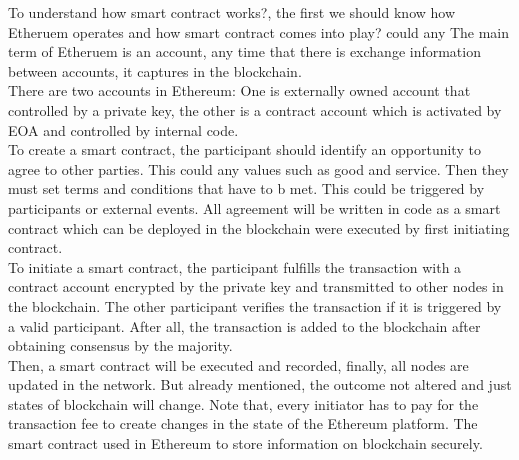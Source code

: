 To understand how smart contract works?, the first we should know how Etheruem operates and how smart contract comes into play?
could any The main term of Etheruem is an account, any time that there is exchange information between accounts, it captures in the blockchain.\\
There are two accounts in Ethereum: One is externally owned account that controlled by a private key, the other is a contract account which is activated by EOA and controlled by internal code.\\
To create a smart contract, the participant should identify an opportunity to agree to other parties. This could any values such as good and service. Then they must set terms and conditions that have to b met. This could be triggered by participants or external events. All agreement will be written in code as a smart contract which can be deployed in the blockchain were executed by first initiating contract.\\
To initiate a smart contract, the participant fulfills the transaction with a contract account encrypted by the private key and transmitted to other nodes in the blockchain. The other participant verifies the transaction if it is triggered by a valid participant. After all, the transaction is added to the blockchain after obtaining consensus by the majority.\\
Then, a smart contract will be executed and recorded, finally, all nodes are updated in the network. But already mentioned, the outcome not altered and just states of blockchain will change. Note that, every initiator has to pay for the transaction fee to create changes in the state of the Ethereum platform. The smart contract used in Ethereum to store information on blockchain securely\cite{Angwei}.\\

